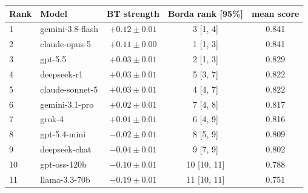\begin{tabular}{llccc}
\toprule
Rank & Model & BT strength & Borda rank [95\%] & mean score \\
\midrule
1 & gemini-3.8-flash & $+0.12 \pm 0.01$ & 3 [1, 4] & 0.841 \\
2 & claude-opus-5 & $+0.11 \pm 0.00$ & 1 [1, 3] & 0.841 \\
3 & gpt-5.5 & $+0.03 \pm 0.01$ & 2 [1, 3] & 0.829 \\
4 & deepseek-r1 & $+0.03 \pm 0.01$ & 5 [3, 7] & 0.822 \\
5 & claude-sonnet-5 & $+0.03 \pm 0.01$ & 4 [4, 7] & 0.822 \\
6 & gemini-3.1-pro & $+0.02 \pm 0.01$ & 7 [4, 8] & 0.817 \\
7 & grok-4 & $+0.01 \pm 0.01$ & 6 [4, 9] & 0.816 \\
8 & gpt-5.4-mini & $-0.02 \pm 0.01$ & 8 [5, 9] & 0.809 \\
9 & deepseek-chat & $-0.04 \pm 0.01$ & 9 [7, 9] & 0.802 \\
10 & gpt-oss-120b & $-0.10 \pm 0.01$ & 10 [10, 11] & 0.788 \\
11 & llama-3.3-70b & $-0.19 \pm 0.01$ & 11 [10, 11] & 0.751 \\
\bottomrule
\end{tabular}
